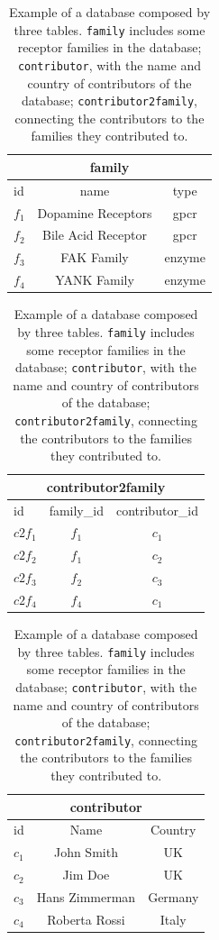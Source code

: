 \begin{table}[]
\centering
\begin{tabular}{| l | cc |}
\multicolumn{3}{c}{\textbf{family}}\\
\hline
 id & name & type \\
  \hline
  $f_1$ & Dopamine Receptors & gpcr \\
  $f_2$ & Bile Acid Receptor & gpcr \\
  $f_3$ & FAK Family         & enzyme \\
  $f_4$ & YANK Family        & enzyme \\
\hline
\end{tabular}	
\begin{tabular}{| l |c c|}
\multicolumn{3}{c}{\textbf{contributor2family}}\\
\hline
 id & family\_id & contributor\_id \\
  \hline
  $c2f_1$ & $f_1$ & $c_1$ \\
  $c2f_2$ & $f_1$ & $c_2$ \\
  $c2f_3$ & $f_2$ & $c_3$ \\
  $c2f_4$ & $f_4$ & $c_1$ \\
\hline
\end{tabular}		
\begin{tabular}{| l |c c|}
\multicolumn{3}{c}{\textbf{contributor}}\\
\hline
 id & Name & Country \\
  \hline
  $c_1$ & John Smith & UK \\
  $c_2$ & Jim Doe & UK \\
  $c_3$ & Hans Zimmerman & Germany \\
  $c_4$ & Roberta Rossi & Italy \\
\hline
\end{tabular}		
\caption{Example of a database composed by three tables. \texttt{family} includes some receptor families in the database; \texttt{contributor}, with the name and country of contributors of the database; \texttt{contributor2family}, connecting the contributors to the families they contributed to.}
\label{table:running_example}
\end{table}
